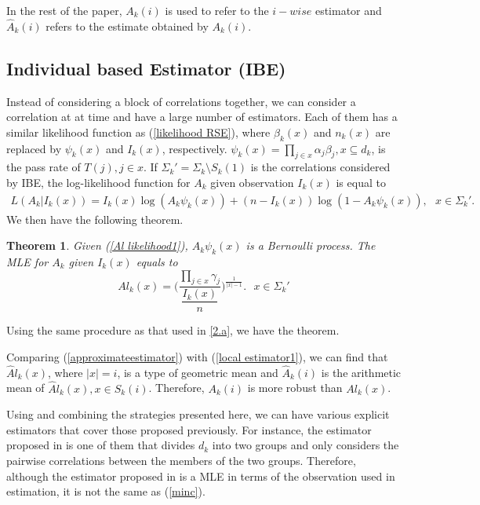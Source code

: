 \documentclass[10pt,onecolumn]{IEEEtran}
\newtheorem{theorem}{\bf Theorem}
\begin{document}
In the rest of the paper, $A_k(i)$ is used to refer to the $i-wise$ estimator and $\widehat A_k(i)$ refers to the estimate obtained by $A_k(i)$.


\subsection{Individual based Estimator (IBE)}

Instead of considering a block of correlations together, we can consider a correlation at at time and have a large number of estimators. Each of them has a similar likelihood function as (\ref{likelihood RSE}), where $\beta_k(x)$ and $n_k(x)$ are replaced by $\psi_k(x)$ and $I_k(x)$, respectively. $\psi_k(x)=\prod_{j \in x} \alpha_j\beta_j, x \subseteq d_k$, is the pass rate of $T(j), j \in x$. If $\Sigma_k'=\Sigma_k \setminus S_k(1)$ is the correlations considered by IBE, the log-likelihood function for $A_k$ given observation $I_k(x)$ is equal to
 \begin{eqnarray}
 L(A_k|I_k(x))=I_k(x)\log (A_k\psi_k(x))+(n-I_k(x))\log(1-A_k\psi_k(x)),  \mbox{   } x \in \Sigma_k'.
 \label{Al likelihood1}
 \end{eqnarray}
 We then have the following theorem.
\begin{theorem}  \label{local estimator}
Given (\ref{Al likelihood1}), $A_k\psi_k(x)$ is a Bernoulli process. The MLE for $A_k$ given $I_k(x)$ equals to
\begin{equation}
Al_k(x)=\Big(\dfrac{\prod_{j\in x} \gamma_j}{\dfrac{I_k(x)}{n}}\Big)^{\frac{1}{|x|-1}}.  \mbox{   }    x \in \Sigma_k'
\label{local estimator1}
\end{equation}
\end{theorem}
	\begin{IEEEproof} Using the same procedure as that used in \ref{2.a}, we have the theorem.
\end{IEEEproof}


Comparing (\ref{approximateestimator}) with (\ref{local estimator1}), we can find that $\widehat Al_k(x)$, where $|x|=i$, is a type of geometric mean and $\widehat A_k(i)$ is the arithmetic mean of $\widehat Al_k(x), x \in S_k(i)$. Therefore, $A_k(i)$ is more robust than $Al_k(x)$.

Using and combining the strategies presented here, we can have various explicit estimators that cover those proposed previously. For instance, the estimator proposed in \cite{ADV07, Zhu11a} is one of them that divides $d_k$ into two groups and only considers the pairwise correlations between the members of the two groups. Therefore, although the estimator proposed in \cite{ADV07, Zhu11a} is a MLE in terms of the observation used in estimation, it is not the same as (\ref{minc}).
\end{document}
